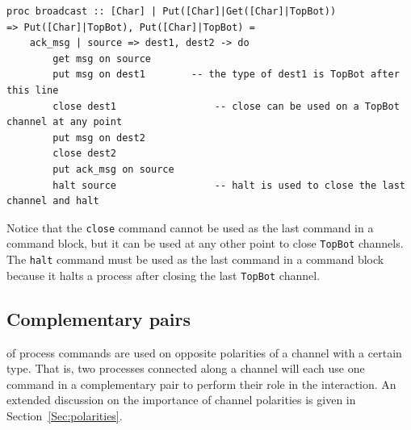 \documentclass[11pt]{article}
\begin{document}
\begin{lstlisting} 
proc broadcast :: [Char] | Put([Char]|Get([Char]|TopBot)) 										=> Put([Char]|TopBot), Put([Char]|TopBot) = 
	ack_msg | source => dest1, dest2 -> do
		get msg on source						
		put msg on dest1		-- the type of dest1 is TopBot after this line
		close dest1					-- close can be used on a TopBot channel at any point
		put msg on dest2
		close dest2    
		put ack_msg on source	
		halt source					-- halt is used to close the last channel and halt
\end{lstlisting}
Notice that the \lstinline$close$ command cannot be used as the last command in a command block, but it can be used at any other point to close \lstinline$TopBot$ channels.
The \lstinline$halt$ command must be used as the last command in a command block because it halts a process after closing the last \lstinline$TopBot$ channel.
 
\subsection{Complementary pairs }
\label{subsec:pairs}

 of process commands are used on opposite polarities of a channel with a certain type.
That is, two processes connected along a channel will each use one command in a complementary pair to perform their role in the interaction.
An extended discussion on the importance of channel polarities is given in Section~\ref{Sec:polarities}.
\end{document}
